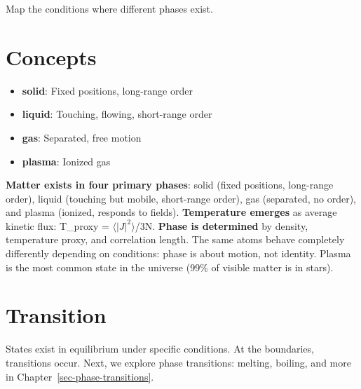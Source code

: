 \documentclass[
  11pt,
  letterpaper,
  twoside,
  openright]{book}
\providecommand{\tightlist}{%
  \setlength{\itemsep}{0pt}\setlength{\parskip}{0pt}}
\begin{document}
Map the conditions where different phases exist.

\section{Concepts}\label{concepts-8}

\begin{itemize}
\tightlist
\item
  \textbf{solid}: Fixed positions, long-range order
\item
  \textbf{liquid}: Touching, flowing, short-range order
\item
  \textbf{gas}: Separated, free motion
\item
  \textbf{plasma}: Ionized gas
\end{itemize}

\begin{tcolorbox}[enhanced jigsaw, coltitle=black, colbacktitle=quarto-callout-note-color!10!white, toprule=.15mm, colframe=quarto-callout-note-color-frame, arc=.35mm, opacityback=0, bottomtitle=1mm, toptitle=1mm, breakable, colback=white, titlerule=0mm, opacitybacktitle=0.6, title=\textcolor{quarto-callout-note-color}{\faInfo}\hspace{0.5em}{Chapter Summary}, rightrule=.15mm, bottomrule=.15mm, leftrule=.75mm, left=2mm]

\textbf{Matter exists in four primary phases}: solid (fixed positions,
long-range order), liquid (touching but mobile, short-range order), gas
(separated, no order), and plasma (ionized, responds to fields).
\textbf{Temperature emerges} as average kinetic flux: T\_proxy =
\(\langle|J|^2\rangle\)/3N. \textbf{Phase is determined} by density,
temperature proxy, and correlation length. The same atoms behave
completely differently depending on conditions: phase is about motion,
not identity. Plasma is the most common state in the universe (99\% of
visible matter is in stars).

\end{tcolorbox}

\section{Transition}\label{transition-8}

States exist in equilibrium under specific conditions. At the
boundaries, transitions occur. Next, we explore phase transitions:
melting, boiling, and more in Chapter~\ref{sec-phase-transitions}.
\end{document}
